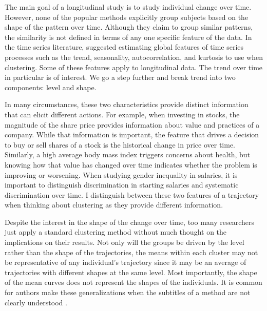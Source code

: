 The main goal of a longitudinal study is to study individual change over time. However, none of the popular methods explicitly group subjects based on the shape of the pattern over time. Although they claim to group similar patterns, the similarity is not defined in terms of any one specific feature of the data. In the time series literature, \textcite{wang2006} suggested estimating global features of time series processes such as the trend, seasonality, autocorrelation, and kurtosis to use when clustering. Some of these features apply to longitudinal data. The trend over time in particular is of interest. We go a step further and break trend into two components: level and shape. 

In many circumstances, these two characteristics provide distinct information that can elicit different actions. For example, when investing in stocks, the magnitude of the share price provides information about value and practices of a company. While that information is important, the feature that drives a decision to buy or sell shares of a stock is the historical change in price over time. Similarly, a high average body mass index triggers concerns about health, but knowing how that value has changed over time indicates whether the problem is improving or worsening. When studying gender inequality in salaries, it is important to distinguish discrimination in starting salaries  and systematic discrimination over time. I distinguish between these two features of a trajectory when thinking about clustering as they provide different information.  

Despite the interest in the shape of the change over time, too many researchers just apply a standard clustering method without much thought on the implications on their results. Not only will the groups be driven by the level rather than the shape of the trajectories, the means within each cluster may not be representative of any individual's trajectory since it may be an average of trajectories with different shapes at the same level. Most importantly, the shape of the mean curves does not represent the shapes of the individuals. It is common for authors make these generalizations when the subtitles of a method are not clearly understood \cite{windle2004,mulvaney2006,broadbent2008,pryor2011,mccoy2010}. 

